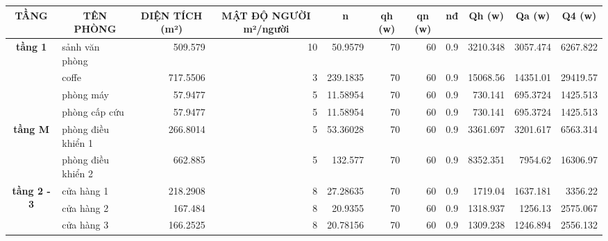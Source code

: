 \begin{landscape}
\begin{table}[H]
	\vspace{1cm}
	\centering
	\begin{adjustbox}{width=1.5\textheight, height=0.4\textwidth}
	\begin{tabular}{|c|l|r|r|r|r|r|r|r|r|r|}
		\hline
		\textbf{TẦNG} & \multicolumn{1}{c|}{\textbf{TÊN PHÒNG}} & \multicolumn{1}{c|}{\textbf{DIỆN TÍCH (m²) }} & \multicolumn{1}{c|}{\textbf{MẬT ĐỘ NGƯỜI m²/người}} & \multicolumn{1}{c|}{\textbf{n}} & \multicolumn{1}{c|}{\textbf{qh (w)}} & \multicolumn{1}{c|}{\textbf{qn (w)}} & \multicolumn{1}{c|}{\textbf{nđ}} & \multicolumn{1}{c|}{\textbf{Qh (w)}} & \multicolumn{1}{c|}{\textbf{Qa (w)}} & \multicolumn{1}{c|}{\textbf{Q4 (w)}} \bigstrut\\
		\hline
		\multirow{4}[8]{*}{\textbf{tầng 1}} & sảnh văn phòng & 509.579  & 10       & 50.9579  & 70       & 60       & 0.9      & 3210.348 & 3057.474 & 6267.822 \bigstrut\\
		\cline{2-11}             & coffe    & 717.5506 & 3        & 239.1835 & 70       & 60       & 0.9      & 15068.56 & 14351.01 & 29419.57 \bigstrut\\
		\cline{2-11}             & phòng máy & 57.9477  & 5        & 11.58954 & 70       & 60       & 0.9      & 730.141  & 695.3724 & 1425.513 \bigstrut\\
		\cline{2-11}             & phòng cấp cứu & 57.9477  & 5        & 11.58954 & 70       & 60       & 0.9      & 730.141  & 695.3724 & 1425.513 \bigstrut\\
		\hline
		\multirow{2}[4]{*}{\textbf{tầng M}} & phòng điều khiển 1 & 266.8014 & 5        & 53.36028 & 70       & 60       & 0.9      & 3361.697 & 3201.617 & 6563.314 \bigstrut\\
		\cline{2-11}             & phòng điều khiển 2 & 662.885  & 5        & 132.577  & 70       & 60       & 0.9      & 8352.351 & 7954.62  & 16306.97 \bigstrut\\
		\hline
		\multirow{6}[12]{*}{\textbf{tầng 2 - 3}} & cửa hàng 1 & 218.2908 & 8        & 27.28635 & 70       & 60       & 0.9      & 1719.04  & 1637.181 & 3356.22 \bigstrut\\
		\cline{2-11}             & cửa hàng 2 & 167.484  & 8        & 20.9355  & 70       & 60       & 0.9      & 1318.937 & 1256.13  & 2575.067 \bigstrut\\
		\cline{2-11}             & cửa hàng 3 & 166.2525 & 8        & 20.78156 & 70       & 60       & 0.9      & 1309.238 & 1246.894 & 2556.132 \bigstrut\\

\end{tabular}
\end{adjustbox}
\end{table}
\end{landscape}
